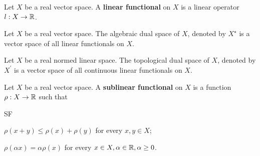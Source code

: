 \begin{definition}
Let $X$ be a real vector space. A \textbf{linear functional} on $X$ is a linear operator $l : X \to {\mathbb R}$.
\end{definition}
\begin{definition}
Let $X$ be a real vector space. The algebraic dual space of $X$, denoted by $X^{\star}$ is a vector space of all linear functionals on $X$.
\end{definition}
\begin{definition}
Let $X$ be a real normed linear space. The topological dual space of $X$, denoted by $X^{'}$ is a vector space of all continuous linear functionals on $X$.
\end{definition}
\begin{definition}
Let $X$ be a real vector space. A \textbf{sublinear functional} on $X$ is a function $\rho : X \to {\mathbb R}$ such that
\begin{axioms}{SF}
  \item \label{defn:func:sl:1} $\rho(x + y) \leq \rho(x) + \rho(y)$ for every $x, y \in X$;
  \item \label{defn:func:sl:2} $\rho(\alpha x) = \alpha \rho(x) $  for every $x \in X, \alpha \in {\mathbb R}, \alpha \geq 0$.
\end{axioms}
\end{definition}

